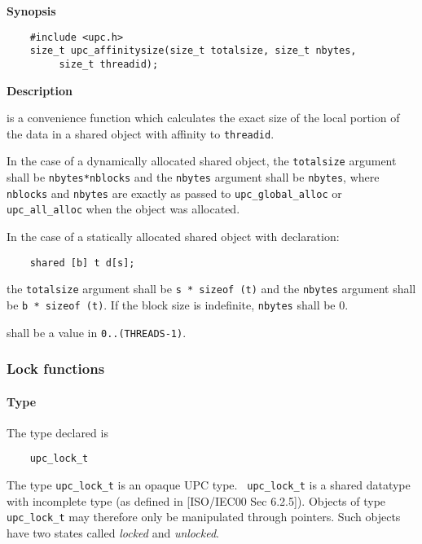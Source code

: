 {\bf Synopsis} 

\npf\vspace{-2.5em}
\begin{verbatim}
    #include <upc.h> 
    size_t upc_affinitysize(size_t totalsize, size_t nbytes, 
         size_t threadid);
\end{verbatim}

{\bf Description}

 is a convenience function which 
    calculates the exact size of the local portion of the data in a 
    shared object with affinity to {\tt threadid}.
    
\np In the case of a dynamically allocated shared object,
    the {\tt totalsize} argument shall be {\tt nbytes*nblocks} and the {\tt nbytes}
    argument shall be {\tt nbytes}, where {\tt nblocks} and {\tt nbytes} are exactly as
    passed to {\tt upc\_global\_alloc} or {\tt upc\_all\_alloc} when the 
    object was allocated.

\np In the case of a statically allocated shared object
    with declaration:

\begin{verbatim}
    shared [b] t d[s];
\end{verbatim}   

    the {\tt totalsize} argument shall be {\tt s * sizeof (t)} and the
    {\tt nbytes} argument shall be {\tt b * sizeof (t)}.  If the block
    size is indefinite, {\tt nbytes} shall be 0.
        
 shall be a value in {\tt 0..(THREADS-1)}.

\subsubsection{Lock functions}
\label{upc_lock}

\paragraph{Type}

\npf The type declared is 

\begin{verbatim}
    upc_lock_t 
\end{verbatim}

\np The type {\tt upc\_lock\_t} is an opaque UPC type. {\tt
    upc\_lock\_t} is a shared datatype with incomplete type (as
    defined in [ISO/IEC00 Sec 6.2.5]).  Objects of type {\tt
    upc\_lock\_t} may therefore only be manipulated through pointers.
    Such objects have two states called {\em locked} and {\em unlocked}.

